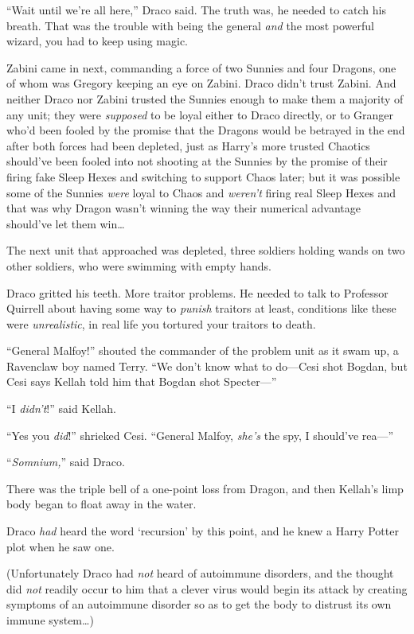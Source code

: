 “Wait until we’re all here,” Draco said. The truth was, he needed to catch his breath. That was the trouble with being the general \emph{and} the most powerful wizard, you had to keep using magic.

Zabini came in next, commanding a force of two Sunnies and four Dragons, one of whom was Gregory keeping an eye on Zabini. Draco didn’t trust Zabini. And neither Draco nor Zabini trusted the Sunnies enough to make them a majority of any unit; they were \emph{supposed} to be loyal either to Draco directly, or to Granger who’d been fooled by the promise that the Dragons would be betrayed in the end after both forces had been depleted, just as Harry’s more trusted Chaotics should’ve been fooled into not shooting at the Sunnies by the promise of their firing fake Sleep Hexes and switching to support Chaos later; but it was possible some of the Sunnies \emph{were} loyal to Chaos and \emph{weren’t} firing real Sleep Hexes and that was why Dragon wasn’t winning the way their numerical advantage should’ve let them win…

The next unit that approached was depleted, three soldiers holding wands on two other soldiers, who were swimming with empty hands.

Draco gritted his teeth. More traitor problems. He needed to talk to Professor Quirrell about having some way to \emph{punish} traitors at least, conditions like these were \emph{unrealistic}, in real life you tortured your traitors to death.

“General Malfoy!” shouted the commander of the problem unit as it swam up, a Ravenclaw boy named Terry.
“We don’t know what to do—Cesi shot Bogdan, but Cesi says Kellah told him that Bogdan shot Specter—”

“I \emph{didn’t}!” said Kellah.

“Yes you \emph{did}!” shrieked Cesi.
“General Malfoy, \emph{she’s} the spy, I should’ve rea—”

“\emph{Somnium,}” said Draco.

There was the triple bell of a one-point loss from Dragon, and then Kellah’s limp body began to float away in the water.

Draco \emph{had} heard the word ‘recursion’ by this point, and he knew a Harry Potter plot when he saw one.

(Unfortunately Draco had \emph{not} heard of autoimmune disorders, and the thought did \emph{not} readily occur to him that a clever virus would begin its attack by creating symptoms of an autoimmune disorder so as to get the body to distrust its own immune system…)

